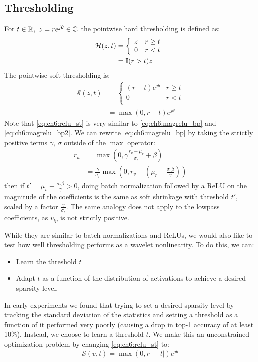 \subsection{Thresholding}
For $t \in \mathbb{R}^{},\ z = re^{j\theta} \in \mathbb{C}^{}$ the pointwise hard thresholding is defined as:
\begin{align}
  \mathcal{H}(z, t) &= \left\{ \begin{array}{ll}
    z & r \geq t \\
    0 & r < t\\
  \end{array} \right. \\
  &= \mathbb{I}(r > t) z
\end{align}
The pointwise soft thresholding is:
\begin{align}
  \mathcal{S}(z, t) &= \left\{ \begin{array}{ll}
    (r-t)e^{j\theta} & r \geq t \\
    0 & r < t\\
  \end{array} \right. \\
  &= \max(0, r - t)e^{j\theta} \label{eq:ch6:relu_st}
\end{align}
Note that \eqref{eq:ch6:relu_st} is very similar to \eqref{eq:ch6:magrelu_bp} and \eqref{eq:ch6:magrelu_bp2}.
We can rewrite \eqref{eq:ch6:magrelu_bp} by taking the strictly positive terms
$\gamma$, $\sigma$ outside of the $\max$ operator:
\begin{align}
  r_u &= \max(0, \gamma \frac{r_v-\mu_r}{\sigma_r} + \beta) \\
      &= \frac{\gamma}{\sigma_r}\max\left(0, r_v - \left(\mu_r - \frac{\sigma_r\beta}{\gamma}\right)\right) \label{eq:ch6:bnrelu_soft}
\end{align}
then if $t' = \mu_v - \frac{\sigma_r\beta}{\gamma} > 0$, doing batch
normalization followed by a ReLU on the magnitude of the coefficients is the
same as soft shrinkage with threshold $t'$, scaled by a factor
$\frac{\gamma}{\sigma_r}$.  
The same analogy does not apply to the lowpass
coefficients, as $v_{lp}$ is not strictly positive. 

While they are similar to batch normalizations and ReLUs, we would also like 
to test how well thresholding performs as a wavelet nonlinearity.
To do this, we can:
\begin{itemize}
  \item Learn the threshold $t$ 
  \item Adapt $t$ as a function of the distribution of activations to achieve a
desired sparsity level. 
\end{itemize}
In early experiments we found that trying to set a
desired sparsity level by tracking the standard deviation of the statistics
and setting a threshold as a function of it performed very poorly (causing a
drop in top-1 accuracy of at least 10\%).
Instead, we choose to learn a threshold $t$. We make this an unconstrained
optimization problem by changing \eqref{eq:ch6:relu_st} to:
\begin{equation}
  \mathcal{S}(v, t) = \max(0, r-|t|)e^{j\theta}  \label{eq:ch6:relu_st2}
\end{equation}

